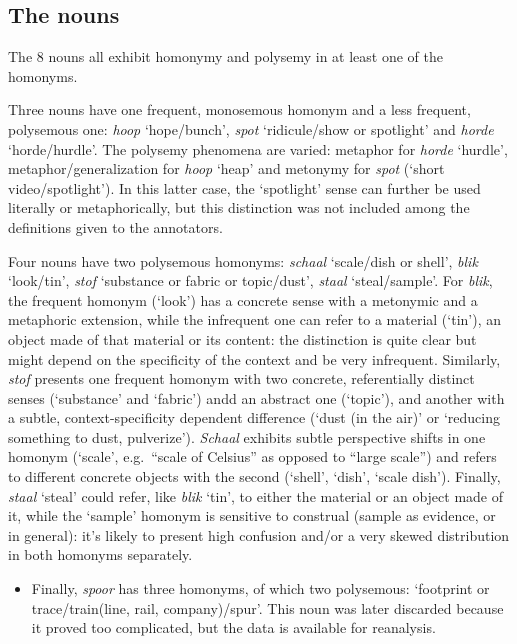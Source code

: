 \documentclass[
]{book}
\providecommand{\tightlist}{%
  \setlength{\itemsep}{0pt}\setlength{\parskip}{0pt}}
\begin{document}
\hypertarget{nouns}{%
\subsection{The nouns}\label{nouns}}

The 8 nouns all exhibit homonymy and polysemy in at least one of the homonyms.

Three nouns have one frequent, monosemous homonym and a less frequent, polysemous one: \emph{hoop} `hope/bunch', \emph{spot} `ridicule/show or spotlight' and \emph{horde} `horde/hurdle'. The polysemy phenomena are varied: metaphor for \emph{horde} `hurdle', metaphor/generalization for \emph{hoop} `heap' and metonymy for \emph{spot} (`short video/spotlight'). In this latter case, the `spotlight' sense can further be used literally or metaphorically, but this distinction was not included among the definitions given to the annotators.

Four nouns have two polysemous homonyms: \emph{schaal} `scale/dish or shell', \emph{blik} `look/tin', \emph{stof} `substance or fabric or topic/dust', \emph{staal} `steal/sample'.
For \emph{blik}, the frequent homonym (`look') has a concrete sense with a metonymic and a metaphoric extension, while the infrequent one can refer to a material (`tin'), an object made of that material or its content: the distinction is quite clear but might depend on the specificity of the context and be very infrequent.
Similarly, \emph{stof} presents one frequent homonym with two concrete, referentially distinct senses (`substance' and `fabric') andd an abstract one (`topic'), and another with a subtle, context-specificity dependent difference (`dust (in the air)' or `reducing something to dust, pulverize'). \emph{Schaal} exhibits subtle perspective shifts in one homonym (`scale', e.g.~``scale of Celsius'' as opposed to ``large scale'') and refers to different concrete objects with the second (`shell', `dish', `scale dish').
Finally, \emph{staal} `steal' could refer, like \emph{blik} `tin', to either the material or an object made of it, while the `sample' homonym is sensitive to construal (sample as evidence, or in general): it's likely to present high confusion and/or a very skewed distribution in both homonyms separately.

\begin{itemize}
\tightlist
\item
  Finally, \emph{spoor} has three homonyms, of which two polysemous: `footprint or trace/train(line, rail, company)/spur'. This noun was later discarded because it proved too complicated, but the data is available for reanalysis.
\end{itemize}
\end{document}
